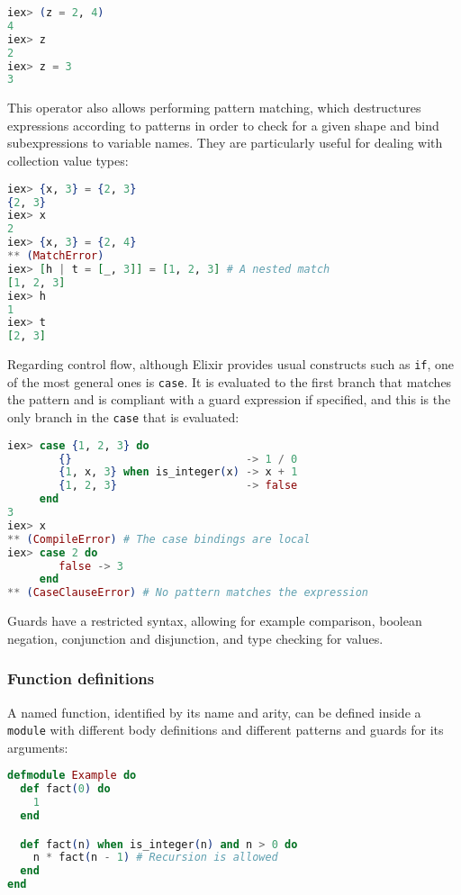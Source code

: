 \begin{lstlisting}[language=elixir,numbers=none,frame=none]
iex> (z = 2, 4)
4
iex> z
2
iex> z = 3
3
\end{lstlisting}

This operator also allows performing pattern matching, which destructures 
expressions according to patterns in order to check for a given shape and bind
subexpressions to variable names. They are particularly useful for dealing with
collection value types:

\begin{lstlisting}[language=elixir,numbers=none,frame=none]
iex> {x, 3} = {2, 3}
{2, 3}
iex> x
2
iex> {x, 3} = {2, 4}
** (MatchError)
iex> [h | t = [_, 3]] = [1, 2, 3] # A nested match
[1, 2, 3]
iex> h
1
iex> t
[2, 3]
\end{lstlisting}

Regarding control flow, although Elixir provides usual constructs such as 
\verb|if|, one of the most general ones is \verb|case|. It is evaluated to the
first branch that matches the pattern and is compliant with a guard expression
if specified, and this is the only branch in the \verb|case| that is evaluated:

\begin{lstlisting}[language=elixir,numbers=none,frame=none]
iex> case {1, 2, 3} do 
        {}                           -> 1 / 0
        {1, x, 3} when is_integer(x) -> x + 1
        {1, 2, 3}                    -> false
     end
3
iex> x
** (CompileError) # The case bindings are local
iex> case 2 do 
        false -> 3 
     end 
** (CaseClauseError) # No pattern matches the expression
\end{lstlisting}

Guards have a restricted syntax, allowing for example comparison, boolean 
negation, conjunction and disjunction, and type checking for values.

\subsubsection{Function definitions}

A named function, identified by its name and arity, can be defined inside a
\verb|module| with different body definitions and different patterns and guards
for its arguments:

\begin{lstlisting}[language=elixir,numbers=none,frame=none]
defmodule Example do 
  def fact(0) do 
    1
  end

  def fact(n) when is_integer(n) and n > 0 do 
    n * fact(n - 1) # Recursion is allowed
  end
end
\end{lstlisting}

